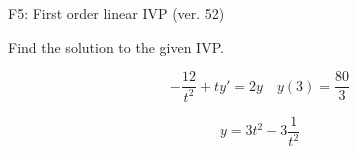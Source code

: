 \begin{exercise}
  \begin{exerciseTitle}F5: First order linear IVP (ver. 52)\end{exerciseTitle}
  \begin{exerciseStatement}
    
Find the solution to the given IVP.

    
\[-\frac{12}{t^{2}} +ty'= 2 y \hspace{1em} y( 3 ) = \frac{80}{3}\]

  \end{exerciseStatement}
  \begin{exerciseAnswer}
    
\[y= 3 t^ 2 -3 \frac{1}{t^{2}}\]

  \end{exerciseAnswer}
\end{exercise}